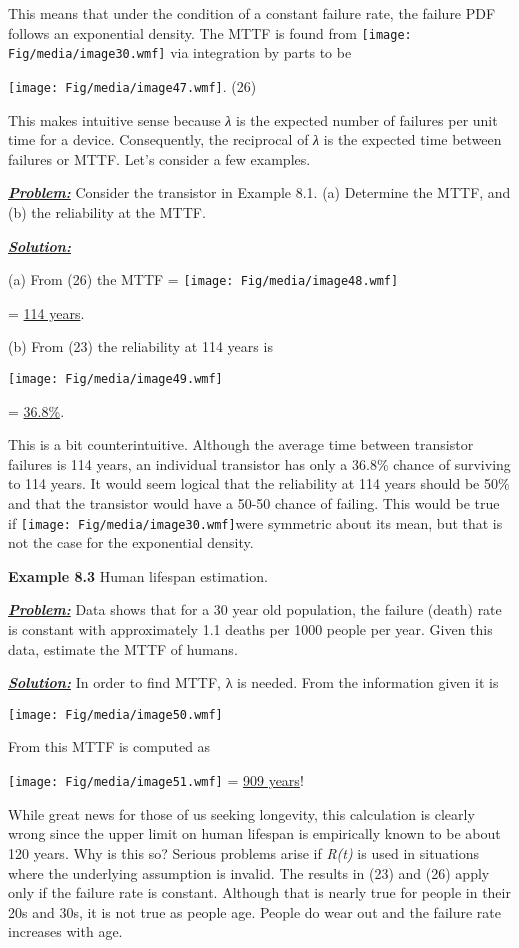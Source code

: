 This means that under the condition of a constant failure rate, the
failure PDF follows an exponential density. The MTTF is found from
\texttt{[image: Fig/media/image30.wmf]} via integration by parts to be

\texttt{[image: Fig/media/image47.wmf]}. (26)

This makes intuitive sense because \emph{λ} is the expected number of
failures per unit time for a device. Consequently, the reciprocal of
\emph{λ} is the expected time between failures or MTTF. Let's consider a
few examples.

\emph{\textbf{\ul{Problem:}}} Consider the transistor in Example 8.1.
(a) Determine the MTTF, and (b) the reliability at the MTTF.

\emph{\textbf{\ul{Solution:}}}

(a) From (26) the MTTF = \texttt{[image: Fig/media/image48.wmf]}

= \ul{114 years}.

(b) From (23) the reliability at 114 years is

\texttt{[image: Fig/media/image49.wmf]}

= \ul{36.8\%}.

This is a bit counterintuitive. Although the average time between
transistor failures is 114 years, an individual transistor has only a
36.8\% chance of surviving to 114 years. It would seem logical that the
reliability at 114 years should be 50\% and that the transistor would
have a 50-50 chance of failing. This would be true if
\texttt{[image: Fig/media/image30.wmf]}were symmetric about its mean,
but that is not the case for the exponential density.

\textbf{Example 8.3} Human lifespan estimation.

\emph{\textbf{\ul{Problem:}}} Data shows that for a 30 year old
population, the failure (death) rate is constant with approximately 1.1
deaths per 1000 people per year. Given this data, estimate the MTTF of
humans.

\emph{\textbf{\ul{Solution:}}} In order to find MTTF, λ is needed. From
the information given it is

\texttt{[image: Fig/media/image50.wmf]}

From this MTTF is computed as

\texttt{[image: Fig/media/image51.wmf]} = \ul{909 years}!

While great news for those of us seeking longevity, this calculation is
clearly wrong since the upper limit on human lifespan is empirically
known to be about 120 years. Why is this so? Serious problems arise if
\emph{R(t)} is used in situations where the underlying assumption is
invalid. The results in (23) and (26) apply only if the failure rate is
constant. Although that is nearly true for people in their 20s and 30s,
it is not true as people age. People do wear out and the failure rate
increases with age.

